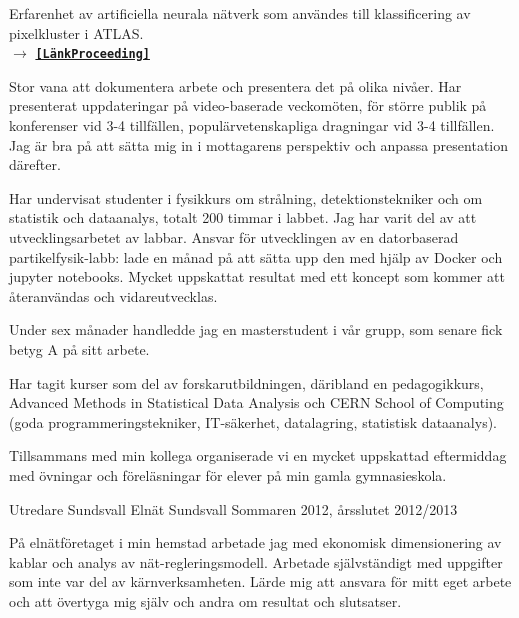 \begin{cventries}
{\begin{cvitems}
\item {Erfarenhet av artificiella neurala nätverk som användes till klassificering av pixelkluster i ATLAS. \\
$\rightarrow$  \href{https://pos.sissa.it/276/213/pdf}{{\bf \texttt{[LänkProceeding]}}}}
\item Stor vana att dokumentera arbete och presentera det på olika nivåer. 
		Har presenterat uppdateringar på video-baserade veckomöten, för större publik på konferenser vid 3-4 tillfällen, populärvetenskapliga dragningar vid 3-4 tillfällen.
		Jag är bra på att sätta mig in i mottagarens perspektiv och anpassa presentation därefter.
\item Har undervisat studenter i fysikkurs om strålning,  detektionstekniker och om statistik och dataanalys, totalt 200 timmar i labbet. Jag har varit del av att utvecklingsarbetet av labbar. Ansvar för utvecklingen av en datorbaserad partikelfysik-labb: lade en månad på att sätta upp den med hjälp av Docker och jupyter notebooks. Mycket uppskattat resultat med ett koncept som kommer att återanvändas och vidareutvecklas.
\item Under sex månader handledde jag en masterstudent i vår grupp, som senare fick betyg A på sitt arbete.
\item Har tagit kurser som del av forskarutbildningen, däribland en pedagogikkurs, Advanced Methods in Statistical Data Analysis och CERN School of Computing (goda programmeringstekniker, IT-säkerhet, datalagring, statistisk dataanalys).
\item Tillsammans med min kollega organiserade vi en mycket uppskattad eftermiddag med övningar och föreläsningar f{\"or} elever på min gamla gymnasieskola.
\end{cvitems}
}



\cventry
{Utredare} %
{Sundsvall Eln\"{a}t} %
{Sundsvall} %
{Sommaren 2012, årsslutet 2012/2013} %
{ %
\begin{cvitems}
\item {På elnätföretaget i min hemstad arbetade jag med ekonomisk dimensionering av kablar och analys av nät-regleringsmodell.
		Arbetade självständigt med uppgifter som inte var del av kärnverksamheten.
		Lärde mig att ansvara för mitt eget arbete och att övertyga mig själv och andra om resultat och slutsatser.}
\end{cvitems}
}


\end{cventries}
